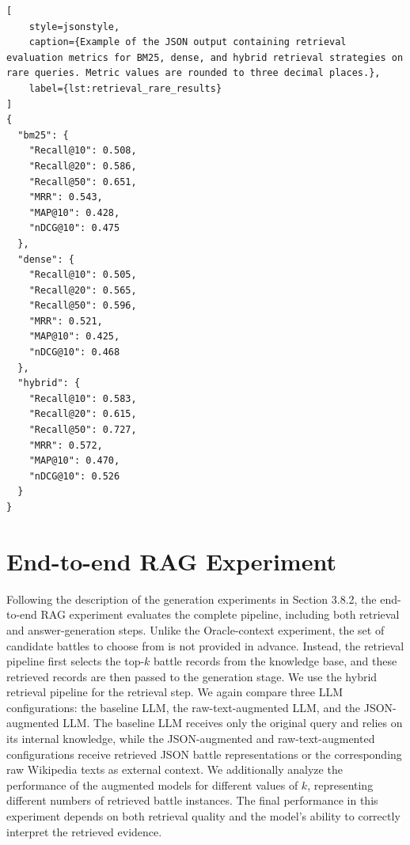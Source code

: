 \begin{minipage}{\textwidth}
\begin{lstlisting}[
    style=jsonstyle,
    caption={Example of the JSON output containing retrieval evaluation metrics for BM25, dense, and hybrid retrieval strategies on rare queries. Metric values are rounded to three decimal places.},
    label={lst:retrieval_rare_results}
]
{
  "bm25": {
    "Recall@10": 0.508,
    "Recall@20": 0.586,
    "Recall@50": 0.651,
    "MRR": 0.543,
    "MAP@10": 0.428,
    "nDCG@10": 0.475
  },
  "dense": {
    "Recall@10": 0.505,
    "Recall@20": 0.565,
    "Recall@50": 0.596,
    "MRR": 0.521,
    "MAP@10": 0.425,
    "nDCG@10": 0.468
  },
  "hybrid": {
    "Recall@10": 0.583,
    "Recall@20": 0.615,
    "Recall@50": 0.727,
    "MRR": 0.572,
    "MAP@10": 0.470,
    "nDCG@10": 0.526
  }
}
\end{lstlisting}
\end{minipage}

\section{End-to-end RAG Experiment}
Following the description of the generation experiments in Section 3.8.2, the end-to-end RAG experiment evaluates the complete pipeline, including both retrieval and answer-generation steps. Unlike the Oracle-context experiment, the set of candidate battles to choose from is not provided in advance. Instead, the retrieval pipeline first selects the top-$k$ battle records from the knowledge base, and these retrieved records are then passed to the generation stage. We use the hybrid retrieval pipeline for the retrieval step. We again compare three LLM configurations: the baseline LLM, the raw-text-augmented LLM, and the JSON-augmented LLM. The baseline LLM receives only the original query and relies on its internal knowledge, while the JSON-augmented and raw-text-augmented configurations receive retrieved JSON battle representations or the corresponding raw Wikipedia texts as external context. We additionally analyze the performance of the augmented models for different values of $k$, representing different numbers of retrieved battle instances. The final performance in this experiment depends on both retrieval quality and the model’s ability to correctly interpret the retrieved evidence.

